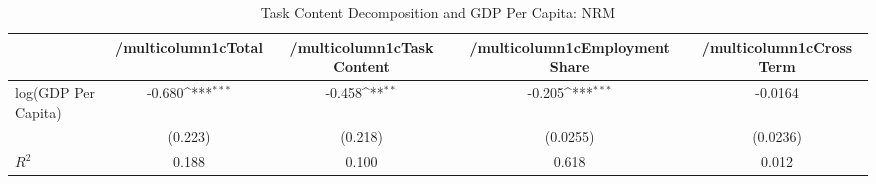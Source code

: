 \begin{table}[htbp]\centering
\def\sym#1{\ifmmode^{#1}\else\(^{#1}\)\fi}
\caption{Task Content Decomposition and GDP Per Capita: NRM}
\begin{tabular}{l*{4}{c}}
\hline\hline
            &/multicolumn{1}{c}{Total}&/multicolumn{1}{c}{Task Content}&/multicolumn{1}{c}{Employment Share}&/multicolumn{1}{c}{Cross Term}\\
\hline
log(GDP Per Capita)&      -0.680\sym{***}&      -0.458\sym{**} &      -0.205\sym{***}&     -0.0164         \\
            &     (0.223)         &     (0.218)         &    (0.0255)         &    (0.0236)         \\
\(R^{2}\)   &       0.188         &       0.100         &       0.618         &       0.012         \\
\hline\hline
\end{tabular}
\end{table}
